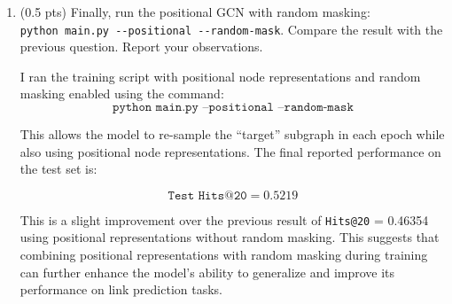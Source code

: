 \begin{enumerate}
\begin{enumerate}
        \item (0.5 pts)
        Finally, run the positional GCN with random masking: \\
        \verb|python main.py --positional --random-mask|. Compare the result with the previous question. Report your observations.

        I ran the training script with positional node representations and
        random masking enabled using the command:
        \[
        \texttt{python main.py --positional --random-mask}
        \]

        This allows the model to re-sample the ``target'' subgraph in each epoch
        while also using positional node representations. The final reported
        performance on the test set is:

        \[
        \texttt{Test Hits@20} = 0.5219
        \]

        This is a slight improvement over the previous result of \texttt{Hits@20} =
        0.46354 using positional representations without random masking. This suggests
        that combining positional representations with random masking during training
        can further enhance the model's ability to generalize and improve its
        performance on link prediction tasks.

    \end{enumerate}
%
\end{enumerate}




